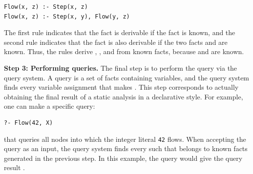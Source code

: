 \begin{lstlisting}[style=mrule]
Flow(x, z) :- Step(x, z)
Flow(x, z) :- Step(x, y), Flow(y, z)
\end{lstlisting}

\noindent
The first rule indicates that the fact  is derivable if the
fact  is known, and the second rule indicates that the fact
 is also derivable if the two facts  and
 are known.  Thus, the rules derive ,
, and  from known facts, because
 and  are known.

\smallskip
\textbf{Step 3: Performing queries.}
The final step is to perform the query via the query system.  A query is a set
of facts containing variables, and the query system finds every variable
assignment that makes .  This step
corresponds to actually obtaining the final result of a static analysis in a
declarative style.  For example, one can make a specific query:

\begin{lstlisting}[style=mrule]
?- Flow(42, X)
\end{lstlisting}

\noindent
that queries all nodes into which the integer literal {\tt 42} flows.  When
accepting the query as an input, the query system finds every  
such that  belongs to known facts generated in the previous
step.  In this example, the query would give the query result .
